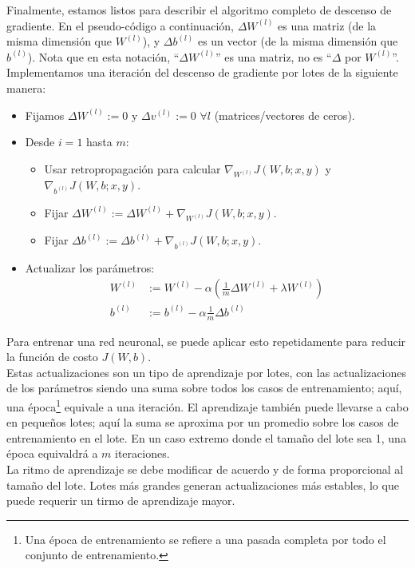 Finalmente, estamos listos para describir el algoritmo completo de descenso de gradiente. En el pseudo-código a continuación, $\Delta W^{(l)}$ es una matriz (de la misma dimensión que $W^{(l)}$), y $\Delta b^{(l)}$ es un vector (de la misma dimensión que $b^{(l)}$). Nota que en esta notación, ``$\Delta W^{(l)}$'' es una matriz, no es ``$\Delta$ por $W^{(l)}$''. Implementamos una iteración del descenso de gradiente por lotes de la siguiente manera:
\begin{itemize}
\item Fijamos $\Delta W^{(l)} := 0$ y $\Delta v^{(l)} := 0$ $\forall l$ (matrices/vectores de ceros).
\item Desde $i = 1$ hasta $m$:
\begin{itemize}
\item Usar retropropagación para calcular $\nabla_{W^{(l)}} J(W, b; x, y)$ y $\nabla_{b^{(l)}} J(W, b; x, y)$.
\item Fijar $\Delta W^{(l)} := \Delta W^{(l)} + \nabla_{W^{(l)}} J(W, b; x, y)$. 
\item Fijar $\Delta b^{(l)} := \Delta b^{(l)} + \nabla_{b^{(l)}} J(W, b; x, y)$.
\end{itemize}
\item Actualizar los parámetros:
\begin{align}
W^{(l)} &:= W^{(l)} - \alpha \left(\frac{1}{m} \Delta W^{(l)} + \lambda W^{(l)}\right) \\
b^{(l)} &:= b^{(l)} - \alpha \frac{1}{m} \Delta b^{(l)}
\end{align}
\end{itemize}

Para entrenar una red neuronal, se puede aplicar esto repetidamente para reducir la función de costo $J(W,b)$. \\

Estas actualizaciones son un tipo de aprendizaje por lotes, con las actualizaciones de los parámetros siendo una suma sobre todos los casos de entrenamiento; aquí, una época\footnote{Una época de entrenamiento se refiere a una pasada completa por todo el conjunto de entrenamiento.} equivale a una iteración. El aprendizaje también puede llevarse a cabo en pequeños lotes; aquí la suma se aproxima por un promedio sobre los casos de entrenamiento en el lote. En un caso extremo donde el tamaño del lote sea 1, una época equivaldrá a $m$ iteraciones. \\

La ritmo de aprendizaje se debe modificar de acuerdo y de forma proporcional al tamaño del lote.
Lotes más grandes generan actualizaciones más estables, lo que puede requerir un tirmo de aprendizaje mayor. \\ 

